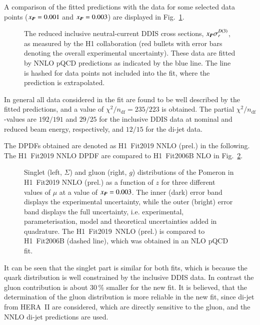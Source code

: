 \documentclass[12pt]{article}
\newcommand{\includegraphicss}[2][]{\fbox{\texttt{[image: \#2]}}}
\begin{document}
A comparison of the fitted predictions with the data for some selected data points ($x_{I\!\!P} = 0.001$ and $x_{I\!\!P} = 0.003$) are displayed in Fig.~\ref{figDDISfit}.
\begin{figure}[tbhp]
\centering
\begin{minipage}[t]{0.47\textwidth}
\includegraphicss[trim={0cm 0.0cm 0 0.0cm},clip,width=.9\textwidth]{{{plots/H1prelim-19-013.fig11}}}
\end{minipage}
\begin{minipage}[t]{0.47\textwidth}
\includegraphicss[trim={0cm 1.2cm 0 1.1cm},clip,width=.9\textwidth]{{{plots/H1prelim-19-013.fig10}}}
\end{minipage}
\caption{The reduced inclusive neutral-current DDIS cross sections, $x_{I\!\!P}\sigma_r^{D(3)}$, as measured by the H1 collaboration (red bullets with error bars denoting the overall experimental uncertainty). These data are fitted by NNLO pQCD predictions as indicated by the blue line. The line is hashed for data points not included into the fit, where the prediction is extrapolated.}
\label{figDDISfit}
\end{figure}
In general all data considered in the fit are found to be well described by the fitted predictions, and
a value of $\chi^2/n_\mathrm{df} = 235/223$ is obtained.
The partial $\chi^2/n_\mathrm{df}$-values are $192/191$  and $29/25$ for the inclusive DDIS data at nominal and reduced beam energy, respectively, and $12/15$ for the di-jet data.

The DPDFs obtained are denoted as H1~Fit2019 NNLO (prel.) in the following. The H1~Fit2019 NNLO DPDF are compared to H1~Fit2006B NLO \cite{Aktas:2006hy} in Fig.~\ref{figDPDF}.
\begin{figure}[tbhp]
\centering
\includegraphicss[trim={0cm 0.5cm 0 1.5cm},clip,width=.7\textwidth]{{{plots/H1prelim-19-013.fig1}}}
\caption{ Singlet (left, $\Sigma$) and gluon (right, $g$) distributions of the Pomeron in H1~Fit2019 NNLO (prel.) as a function of $z$ for three different values of $\mu$ at a value of $x_{I\!\!P} = 0.003$. The inner (dark) error band displays the experimental uncertainty, while the outer (bright) error band displays the full uncertainty, i.e. experimental, parameterisation, model and theoretical uncertainties added in quadrature. The H1~Fit2019~NNLO (prel.) is compared to H1~Fit2006B (dashed line), which was obtained in an NLO pQCD fit.}
\label{figDPDF}
\end{figure}
%
It can be seen that the singlet part is similar for both fits, which is because the quark distribution is well constrained by the inclusive DDIS data.
In contrast the gluon contribution is about 30\,\% smaller for the new fit. It is believed, that the determination of the gluon distribution is more reliable in the new fit, since di-jet from HERA~II are considered, which are directly sensitive to the gluon, and the NNLO di-jet predictions are used.
\end{document}
